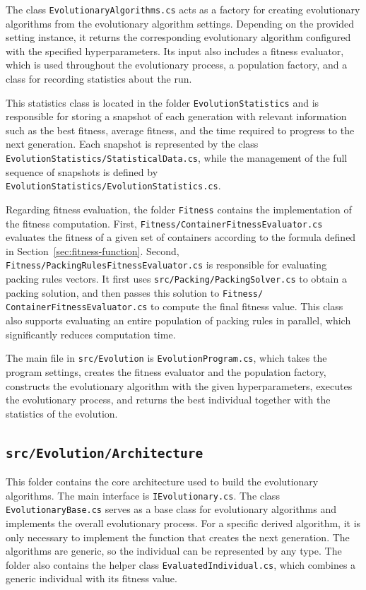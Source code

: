 The class \texttt{EvolutionaryAlgorithms.cs} acts as a factory for creating evolutionary algorithms from the evolutionary algorithm settings. 
Depending on the provided setting instance, it returns the corresponding evolutionary algorithm configured with the specified hyperparameters. 
Its input also includes a fitness evaluator, which is used throughout the evolutionary process, 
a population factory, and a class for recording statistics about the run.

This statistics class is located in the folder \texttt{EvolutionStatistics} and is responsible for storing
a snapshot of each generation with relevant information such as the best fitness, average fitness, 
and the time required to progress to the next generation.
Each snapshot is represented by the class \texttt{EvolutionStatistics/\allowbreak StatisticalData.cs}, 
while the management of the full sequence of snapshots is defined by 
\texttt{EvolutionStatistics/\allowbreak EvolutionStatistics.cs}.

Regarding fitness evaluation, the folder \texttt{Fitness} contains the implementation of the fitness computation.
First, \texttt{Fitness/\allowbreak ContainerFitnessEvaluator.cs} evaluates the fitness of a 
given set of containers according to the formula defined in Section~\ref{sec:fitness-function}.
Second, \texttt{Fitness/\allowbreak PackingRulesFitnessEvaluator.cs} is responsible for evaluating packing rules vectors. 
It first uses \texttt{src/\allowbreak Packing/PackingSolver.cs} to obtain a packing solution, 
and then passes this solution to \texttt{Fitness/\\ContainerFitnessEvaluator.cs} to compute the final fitness value.
This class also supports evaluating an entire population of packing rules in parallel, which significantly reduces computation time.

The main file in \texttt{src/Evolution} is \texttt{EvolutionProgram.cs}, 
which takes the program settings, creates the fitness evaluator and the population factory, 
constructs the evolutionary algorithm with the given hyperparameters, 
executes the evolutionary process, and returns the best individual together with the statistics of the evolution.

\subsection{\texttt{src/Evolution/Architecture}}

This folder contains the core architecture used to build the evolutionary algorithms.
The main interface is \texttt{IEvolutionary.cs}. 
The class\\\texttt{EvolutionaryBase.cs} serves as a base class for evolutionary algorithms and implements the overall evolutionary process. 
For a specific derived algorithm, it is only necessary to implement the function that creates the next generation.
The algorithms are generic, so the individual can be represented by any type. 
The folder also contains the helper class \texttt{EvaluatedIndividual.cs}, which combines a generic individual with its fitness value.

